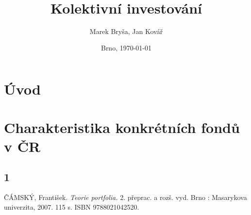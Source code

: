 \documentclass[a4paper,12pt]{article}
\title{Kolektivní investování}
\author{Marek Bryša, Jan Kovář}
\date{Brno, \today}
\begin{document}
\maketitle

\section{Úvod}

\section{Charakteristika konkrétních fondů v ČR}
	\subsection{1}
	

\renewcommand{\bibname}{Seznam použité literatury}
\begin{thebibliography}{9}
\thispagestyle{plain}
 ČÁMSKÝ, František. \emph{Teorie portfolia.} 2. přeprac. a rozš. vyd. Brno : Masarykova univerzita, 2007. 115 s. ISBN 9788021042520.

\end{thebibliography}
\end{document}
